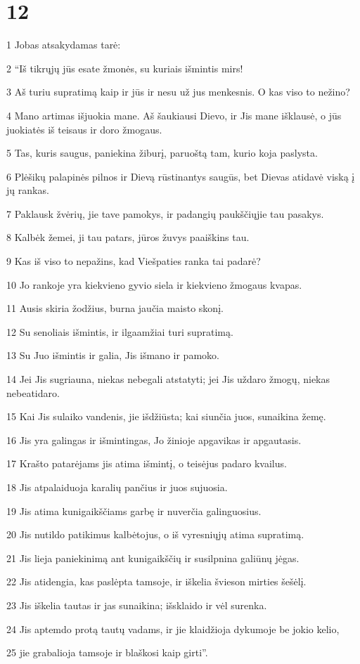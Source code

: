 \chapter{12}


\par 1 Jobas atsakydamas tarė: 
\par 2 “Iš tikrųjų jūs esate žmonės, su kuriais išmintis mirs! 
\par 3 Aš turiu supratimą kaip ir jūs ir nesu už jus menkesnis. O kas viso to nežino? 
\par 4 Mano artimas išjuokia mane. Aš šaukiausi Dievo, ir Jis mane išklausė, o jūs juokiatės iš teisaus ir doro žmogaus. 
\par 5 Tas, kuris saugus, paniekina žiburį, paruoštą tam, kurio koja paslysta. 
\par 6 Plėšikų palapinės pilnos ir Dievą rūstinantys saugūs, bet Dievas atidavė viską į jų rankas. 
\par 7 Paklausk žvėrių, jie tave pamokys, ir padangių paukščių­jie tau pasakys. 
\par 8 Kalbėk žemei, ji tau patars, jūros žuvys paaiškins tau. 
\par 9 Kas iš viso to nepažins, kad Viešpaties ranka tai padarė? 
\par 10 Jo rankoje yra kiekvieno gyvio siela ir kiekvieno žmogaus kvapas. 
\par 11 Ausis skiria žodžius, burna jaučia maisto skonį. 
\par 12 Su senoliais išmintis, ir ilgaamžiai turi supratimą. 
\par 13 Su Juo išmintis ir galia, Jis išmano ir pamoko. 
\par 14 Jei Jis sugriauna, niekas nebegali atstatyti; jei Jis uždaro žmogų, niekas nebeatidaro. 
\par 15 Kai Jis sulaiko vandenis, jie išdžiūsta; kai siunčia juos, sunaikina žemę. 
\par 16 Jis yra galingas ir išmintingas, Jo žinioje apgavikas ir apgautasis. 
\par 17 Krašto patarėjams jis atima išmintį, o teisėjus padaro kvailus. 
\par 18 Jis atpalaiduoja karalių pančius ir juos sujuosia. 
\par 19 Jis atima kunigaikščiams garbę ir nuverčia galinguosius. 
\par 20 Jis nutildo patikimus kalbėtojus, o iš vyresniųjų atima supratimą. 
\par 21 Jis lieja paniekinimą ant kunigaikščių ir susilpnina galiūnų jėgas. 
\par 22 Jis atidengia, kas paslėpta tamsoje, ir iškelia švieson mirties šešėlį. 
\par 23 Jis iškelia tautas ir jas sunaikina; išsklaido ir vėl surenka. 
\par 24 Jis aptemdo protą tautų vadams, ir jie klaidžioja dykumoje be jokio kelio, 
\par 25 jie grabalioja tamsoje ir blaškosi kaip girti”.



